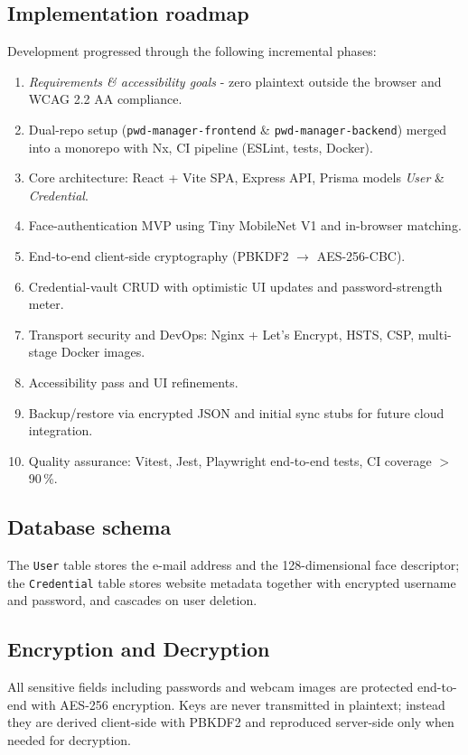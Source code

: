 \subsection{Implementation roadmap}
Development progressed through the following incremental phases:

\begin{enumerate}[label=\textbf{Phase~\arabic*:}, leftmargin=2.5em]
  \item \emph{Requirements \& accessibility goals} - zero plaintext outside the browser and WCAG 2.2 AA compliance.%
  \item Dual-repo setup (\texttt{pwd-manager-frontend} \& \texttt{pwd-manager-backend}) merged into a monorepo with Nx, CI pipeline (ESLint, tests, Docker).%
  \item Core architecture: React + Vite SPA, Express API, Prisma models \emph{User} \& \emph{Credential}.%
  \item Face-authentication MVP using Tiny MobileNet V1 and in-browser matching.%
  \item End-to-end client-side cryptography (PBKDF2 $\rightarrow$ AES-256-CBC).%
  \item Credential-vault CRUD with optimistic UI updates and password-strength meter.%
  \item Transport security and DevOps: Nginx + Let's Encrypt, HSTS, CSP, multi-stage Docker images.%
  \item Accessibility pass and UI refinements.%
  \item Backup/restore via encrypted JSON and initial sync stubs for future cloud integration.%
  \item Quality assurance: Vitest, Jest, Playwright end-to-end tests, CI coverage $>$90\,\%.%
\end{enumerate}


\subsection{Database schema}
The \texttt{User} table stores the e-mail address and the 128-dimensional face descriptor; the \texttt{Credential} table stores website metadata together with encrypted username and password, and cascades on user deletion.


\subsection{Encryption and Decryption}\label{subsec:encryption}

All sensitive fields including passwords and webcam images are protected end-to-end with AES-256 encryption.
Keys are never transmitted in plaintext; instead they are derived client-side with PBKDF2 and reproduced server-side only when needed for decryption.

